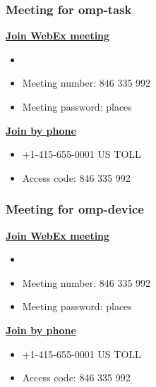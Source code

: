 
\begin{frame}[label=omp_task]
\frametitle{Meeting for omp-task}
\underline{\bf Join WebEx meeting}
\begin{itemize}
\small \item \small \url{}   
\item \small Meeting number: 846 335 992
\item \small Meeting password: places
\end{itemize}
\underline{\bf Join by phone}
\begin{itemize}
\item +1-415-655-0001 US TOLL
\item Access code: 846 335 992
\end{itemize}
\end{frame}


\begin{frame}[label=omp_device]
\frametitle{Meeting for omp-device}
\underline{\bf Join WebEx meeting}
\begin{itemize}
\small \item \small \url{}   
\item \small Meeting number: 846 335 992
\item \small Meeting password: places
\end{itemize}
\underline{\bf Join by phone}
\begin{itemize}
\item +1-415-655-0001 US TOLL
\item Access code: 846 335 992
\end{itemize}
\end{frame}
